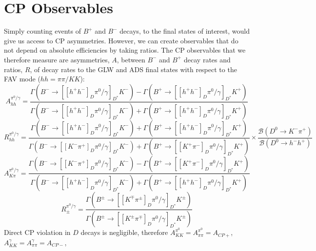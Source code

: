 \documentclass[oneside,12pt]{article}
\begin{document}
\section{\normalsize CP Observables} Simply counting events of $B^{+}$ and
$B^{-}$ decays, to the final states of interest, would give us access to CP
asymmetries. However, we can create observables that do not depend on absolute
efficiencies by taking ratios. The CP observables that we therefore measure are
asymmetries, $A$, between $B^{-}$ and $B^{+}$ decay rates and ratios, $R$, of
decay rates to the GLW and ADS final states with respect to the FAV mode
($hh=\pi \pi /KK$):
  \begin{equation}
		A_{hh}^{\pi^{0}/\gamma}=\frac{\Gamma(B^{-}\rightarrow [[h^{+}h^{-}]_{D}\pi^{0}/\gamma]_{D^{*}}K^{-})-\Gamma(B^{+}\rightarrow [[h^{+}h^{-}]_{D}\pi^{0}/\gamma]_{D^{*}}K^{+})}{\Gamma(B^{-}\rightarrow [[h^{+}h^{-}]_{D}\pi^{0}/\gamma]_{D^{*}}K^{-})+\Gamma(B^{+}\rightarrow [[h^{+}h^{-}]_{D}\pi^{0}/\gamma]_{D^{*}}K^{+})}
    \label{eq:Aglw}
  \end{equation}
  \begin{equation}
		R_{hh}^{\pi^{0}/\gamma}=\frac{\Gamma(B^{-}\rightarrow [[h^{+}h^{-}]_{D}\pi^{0}/\gamma]_{D^{*}}K^{-})+\Gamma(B^{+}\rightarrow [[h^{+}h^{-}]_{D}\pi^{0}/\gamma]_{D^{*}}K^{+})}{\Gamma(B^{-}\rightarrow [[K^{-}\pi^{+}]_{D}\pi^{0}/\gamma]_{D^{*}}K^{-})+\Gamma(B^{+}\rightarrow [[K^{+}\pi^{-}]_{D}\pi^{0}/\gamma]_{D^{*}}K^{+})} \times \frac{\mathcal{B}(D^{0}\rightarrow K^{-}\pi^{+})}{\mathcal{B}(D^{0}\rightarrow h^{-}h^{+})}
    \label{eq:Rglw}
  \end{equation}
  \begin{equation}
		A_{K\pi}^{\pi^{0}/\gamma}=\frac{\Gamma(B^{-}\rightarrow [[K^{-}\pi^{+}]_{D}\pi^{0}/\gamma]_{D^{*}}K^{-})-\Gamma(B^{+}\rightarrow [[K^{+}\pi^{-}]_{D}\pi^{0}/\gamma]_{D^{*}}K^{+})}{\Gamma(B^{-}\rightarrow [[h^{+}h^{-}]_{D}\pi^{0}/\gamma]_{D^{*}}K^{-})+\Gamma(B^{+}\rightarrow [[h^{+}h^{-}]_{D}\pi^{0}/\gamma]_{D^{*}}K^{+})}
    \label{eq:Afav}
  \end{equation}
  \begin{equation}
		R_{\pm}^{\pi^{0}/\gamma}=\frac{\Gamma(B^{\pm}\rightarrow [[K^{\mp}\pi^{\pm}]_{D}\pi^{0}/\gamma]_{D^{*}}K^{\pm})}{\Gamma(B^{\pm}\rightarrow [[K^{\pm}\pi^{\mp}]_{D}\pi^{0}/\gamma]_{D^{*}}K^{\pm})}
    \label{eq:Rads}
  \end{equation}
\noindent Direct CP violation in $D$ decays is negligible, therefore
$A_{KK}^{\pi^{0}}=A_{\pi\pi}^{\pi^{0}}=A_{CP+}$,
$A_{KK}^{\gamma}=A_{\pi\pi}^{\gamma}=A_{CP-}$,
\end{document}
